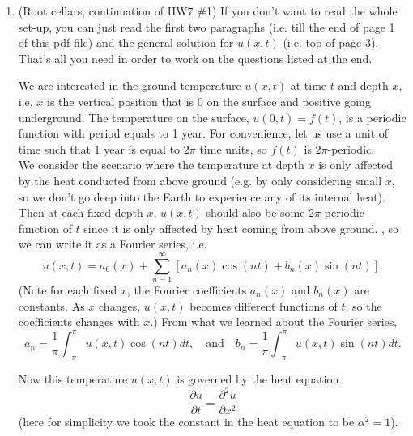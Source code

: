 \documentclass[11pt]{article}
\theoremstyle{definition}
\begin{document}
\begin{enumerate}[leftmargin=*]
\item (Root cellars, continuation of HW7 \#1)  If you don't want to read the whole set-up, you can just read the first two paragraphs (i.e. till the end of page 1 of this pdf file) and the general solution for $u(x,t)$ (i.e. top of page 3).  That's all you need in order to work on  the questions listed at the end.  

We are interested in the ground temperature $u(x,t)$ at time $t$ and depth $x$, i.e. $x$ is the vertical position that is 0 on the surface and positive going underground.   The temperature on the surface, $u(0,t)=f(t)$, is a periodic function with period equals to 1 year.  For convenience, let us use a unit of time such that 1 year is equal to $2\pi$ time units, so $f(t)$ is $2\pi$-periodic.\\

We consider the scenario where the temperature at depth $x$ is only affected by the heat conducted from above ground (e.g. by only considering small $x$, so we don't go deep into the Earth to experience any of its internal heat).  Then at each fixed depth $x$, $u(x,t)$ should also be some $2\pi$-periodic function of $t$ since it is only affected by heat coming from above ground.  , so we can write it as a Fourier series, i.e.
\[
u(x,t)=a_{0}(x)+\sum_{n=1}^{\infty}\left[ a_{n}(x)\cos(nt)+b_{n}(x)\sin(nt) \right].
\] 
(Note for each fixed $x$, the Fourier coefficients $a_n(x)$ and $b_n(x)$ are constants.  As $x$ changes, $u(x,t)$ becomes different functions of $t$, so the coefficients changes with $x$.)  From what we learned about the Fourier series,
\[
a_n=\frac{1}{\pi}\int_{-\pi}^\pi u(x,t)\cos (nt)dt, \quad \text{and}\quad b_n=\frac{1}{\pi}\int_{-\pi}^\pi u(x,t)\sin (nt)dt.\]


Now this temperature $u(x,t)$ is governed by the heat equation
\[
\frac{\partial u}{\partial t}=\frac{\partial^2 u}{\partial x^2}
\]
(here for simplicity we took the constant in the heat equation to be $\alpha^2=1$).   \\


\end{enumerate}
\end{document}
